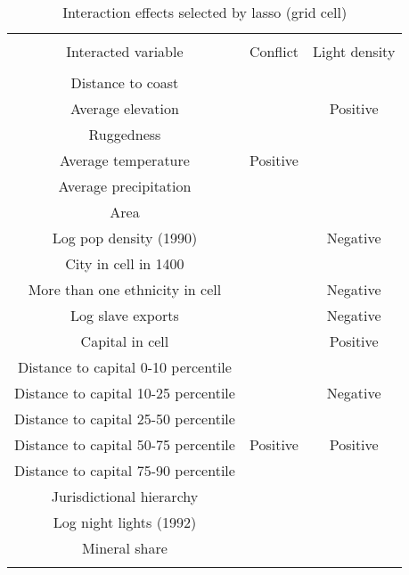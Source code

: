 
\begin{table}[!htbp] \centering 
  \caption{Interaction effects selected by lasso (grid cell)} 
  \label{} 
\footnotesize 
\begin{tabular}{@{\extracolsep{2pt}} ccc} 
\\[-1.8ex]\hline 
\hline \\[-1.8ex] 
Interacted variable & Conflict & Light density \\ 
\hline \\[-1.8ex] 
Distance to coast &   &   \\ 
Average elevation &   & Positive \\ 
Ruggedness &   &   \\ 
Average temperature & Positive &   \\ 
Average precipitation &   &   \\ 
Area &   &   \\ 
Log pop density (1990) &   & Negative \\ 
City in cell in 1400 &   &   \\ 
More than one ethnicity in cell &   & Negative \\ 
Log slave exports &   & Negative \\ 
Capital in cell &   & Positive \\ 
Distance to capital 0-10 percentile &   &   \\ 
Distance to capital 10-25 percentile &   & Negative \\ 
Distance to capital 25-50 percentile &   &   \\ 
Distance to capital 50-75 percentile & Positive & Positive \\ 
Distance to capital 75-90 percentile &   &   \\ 
Jurisdictional hierarchy &   &   \\ 
Log night lights (1992) &   &   \\ 
Mineral share &   &   \\ 
\hline \\[-1.8ex] 
\end{tabular} 
\end{table} 
